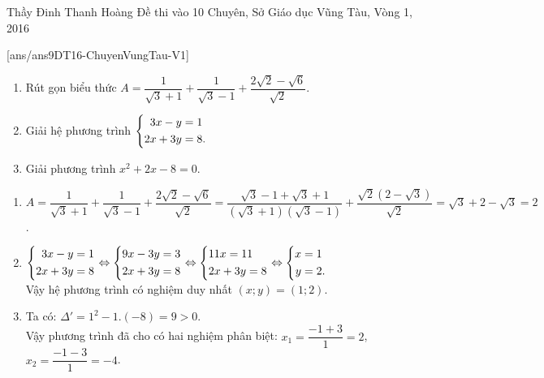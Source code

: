 \begin{name}
{Thầy Đinh Thanh Hoàng}
{Đề thi vào 10 Chuyên, Sở Giáo dục Vũng Tàu, Vòng 1, 2016}
\end{name}
\setcounter{ex}{0}
[ans/ans9DT16-ChuyenVungTau-V1]
\begin{ex}%
    \hfill
    \begin{enumerate}
        \item Rút gọn biểu thức $A=\dfrac{1}{\sqrt{3}+1}+\dfrac{1}{\sqrt{3}-1}+\dfrac{2\sqrt{2}-\sqrt{6}}{\sqrt{2}}$.
        \item Giải hệ phương trình $\left\{\begin{aligned}3x-y&=1\\ 2x+3y&=8.\end{aligned}\right.$
        \item Giải phương trình $x^2+2x-8=0$.
    \end{enumerate}
\loigiai
    {
    \begin{enumerate}
        \item $A=\dfrac{1}{\sqrt{3}+1}+\dfrac{1}{\sqrt{3}-1}+\dfrac{2\sqrt{2}-\sqrt{6}}{\sqrt{2}}=\dfrac{\sqrt{3}-1+\sqrt{3}+1}{\left(\sqrt{3}+1\right)\left(\sqrt{3}-1\right)}+\dfrac{\sqrt{2}\left(2-\sqrt{3}\right)}{\sqrt{2}}=\sqrt{3}+2-\sqrt{3}=2$.
        \item $\left\{\begin{aligned}3x-y&=1\\ 2x+3y&=8\end{aligned}\right.\Leftrightarrow \left\{\begin{aligned}9x-3y&=3\\2x+3y&=8\end{aligned}\right.\Leftrightarrow\left\{\begin{aligned}&11x=11\\&2x+3y=8\end{aligned}\right.\Leftrightarrow\left\{\begin{aligned}x&=1\\y&=2.\end{aligned}\right.$\\
        		Vậy hệ phương trình có nghiệm duy nhất $(x; y)=(1; 2)$.
        \item Ta có: $\Delta ' = 1^2-1.(-8)=9>0$.\\
        		Vậy phương trình đã cho có hai nghiệm phân biệt: $x_1=\dfrac{-1+3}{1}=2$, $x_2=\dfrac{-1-3}{1}=-4$.
    \end{enumerate}
    }
\end{ex}

